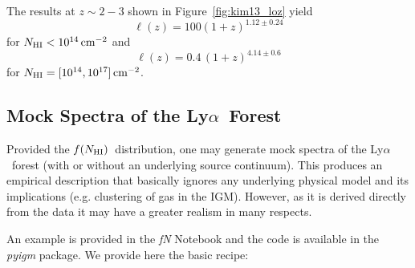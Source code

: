 \documentclass[graybox]{svmult}
\def\lya{Ly$\alpha$}
\newcommand{\mnhi}{N_{\rm HI}}
\newcommand{\nhi}{$\mnhi$}
\def\cm#1{\, {\rm cm^{#1}}}
\def\mfnhi{f(\mnhi)}
\def\fnhi{$\mfnhi$}
\begin{document}
The results at $z \sim 2-3$ shown in Figure~\ref{fig:kim13_loz}
yield
\begin{equation}
\ell(z) = 100 (1+z)^{1.12 \pm 0.24}
\end{equation}
for $\mnhi < 10^{14} \cm{-2}$ and
\begin{equation}
\ell(z) = 0.4 \, (1+z)^{4.14 \pm 0.6}
\end{equation}
for $\mnhi = [10^{14}, 10^{17}] \cm{-2}$.


\subsection{Mock Spectra of the \lya\ Forest}
Provided the \fnhi\ distribution, one may generate mock
spectra of the \lya\ forest (with or without an underlying
source continuum).  This produces an empirical description
that basically ignores any underlying physical model
and its implications (e.g. clustering of gas in the IGM).
However, as it is derived directly from the data it may
have a greater realism in many respects.  

An example is provided in the {\it fN} Notebook and the
code is available in the {\it pyigm} package.  We provide
here the basic recipe:
\end{document}
